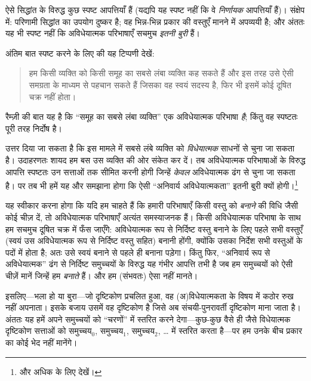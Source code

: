 \documentclass[../../../include/open-logic-section]{subfiles}
\begin{document}
ऐसे सिद्धांत के विरुद्ध कुछ स्पष्ट आपत्तियाँ हैं (यद्यपि यह स्पष्ट नहीं कि
वे \emph{निर्णायक} आपत्तियाँ हैं)। संक्षेप में: परिणामी सिद्धांत का उपयोग
दुष्कर है; वह भिन्न-भिन्न प्रकार की वस्तुएँ मानने में अपव्ययी है; और अंततः
यह भी स्पष्ट नहीं कि अविधेयात्मक परिभाषाएँ सचमुच \emph{इतनी बुरी} हैं।
	
अंतिम बात स्पष्ट करने के लिए \citeauthor{Ramsey1925} की यह टिप्पणी देखें:
\begin{quote}
	हम किसी व्यक्ति को किसी समूह का सबसे लंबा व्यक्ति कह सकते हैं और इस तरह
	उसे ऐसी समग्रता के माध्यम से पहचान सकते हैं जिसका वह स्वयं सदस्य है,
	फिर भी इसमें कोई दूषित चक्र नहीं होता। \citep{Ramsey1925}
\end{quote}
रैम्ज़ी की बात यह है कि ``समूह का सबसे लंबा व्यक्ति'' एक अविधेयात्मक
परिभाषा \emph{है}; किंतु वह स्पष्टतः पूरी तरह निर्दोष है।

उत्तर दिया जा सकता है कि इस मामले में सबसे लंबे व्यक्ति को
\emph{विधेयात्मक} साधनों से चुना जा सकता है। उदाहरणतः शायद हम बस उस व्यक्ति
की ओर संकेत कर दें। तब अविधेयात्मक परिभाषाओं के विरुद्ध आपत्ति स्पष्टतः उन
सत्ताओं तक सीमित करनी होगी जिन्हें \emph{केवल} अविधेयात्मक ढंग से चुना जा
सकता है। पर तब भी हमें यह और समझाना होगा कि ऐसी ``अनिवार्य अविधेयात्मकता''
इतनी बुरी क्यों होगी।\footnote{और अधिक के लिए \citet{Linnebo2010} देखें।}

यह स्वीकार करना होगा कि यदि हम चाहते हैं कि हमारी परिभाषाएँ किसी वस्तु को
\emph{बनाने} की विधि जैसी कोई चीज़ दें, तो अविधेयात्मक परिभाषाएँ अत्यंत
समस्याजनक हैं। किसी अविधेयात्मक परिभाषा के साथ हम सचमुच दूषित चक्र में फँस
जाएँगे: अविधेयात्मक रूप से निर्दिष्ट वस्तु बनाने के लिए पहले सभी वस्तुएँ
(स्वयं उस अविधेयात्मक रूप से निर्दिष्ट वस्तु सहित) बनानी होंगी, क्योंकि उसका
निर्देश सभी वस्तुओं के पदों में होता है; अतः उसे स्वयं बनाने से पहले ही
बनाना पड़ेगा। किंतु फिर, ``अनिवार्य रूप से अविधेयात्मक'' ढंग से निर्दिष्ट
समुच्चयों के विरुद्ध यह गंभीर आपत्ति तभी है जब हम समुच्चयों को ऐसी चीज़ें
मानें जिन्हें हम \emph{बनाते} हैं। और हम (संभवतः) ऐसा नहीं मानते।

इसलिए---भला हो या बुरा---जो दृष्टिकोण प्रचलित हुआ, वह
(अ)\-वि\-धे\-यात्\-मक\-ता के विषय में कठोर रुख नहीं अपनाता। इसके बजाय उसमें
वह दृष्टिकोण है जिसे अब संचयी-पुनरावर्ती दृष्टिकोण माना जाता है। अंततः यह
हमें अपने समुच्चयों को ``चरणों'' में स्तरित करने देगा---कुछ-कुछ वैसे ही जैसे
विधेयात्मक दृष्टिकोण सत्ताओं को समुच्चय$_0$, समुच्चय$_1$, समुच्चय$_2$,
\ldots{} में स्तरित करता है---पर हम उनके बीच प्रकार का कोई भेद नहीं मानेंगे।
\end{document}
